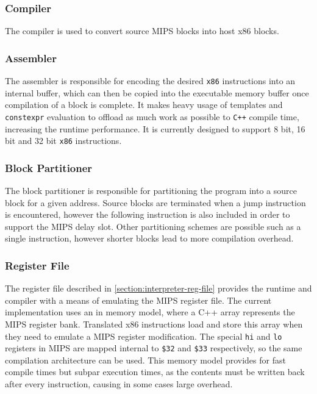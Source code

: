 \subsubsection{Compiler}

The compiler is used to convert source MIPS blocks into host x86 blocks.

\subsubsection{Assembler}

The assembler is responsible for encoding the desired \texttt{x86} instructions into an internal buffer, which can then be copied into the executable memory buffer once compilation of a block is complete. It makes heavy usage of templates and \texttt{constexpr} evaluation to offload as much work as possible to \texttt{C++} compile time, increasing the runtime performance. It is currently designed to support 8 bit, 16 bit and 32 bit \texttt{x86} instructions.

\subsubsection{Block Partitioner}

The block partitioner is responsible for partitioning the program into a source block for a given address. Source blocks are terminated when a jump instruction is encountered, however the following instruction is also included in order to support the MIPS delay slot. Other partitioning schemes are possible such as a single instruction, however shorter blocks lead to more compilation overhead.

\subsubsection{Register File}

The register file described in \autoref{section:interpreter-reg-file} provides the runtime and compiler with a means of emulating the MIPS register file. The current implementation uses an in memory model, where a C++ array represents the MIPS register bank. Translated x86 instructions load and store this array when they need to emulate a MIPS register modification. The special \texttt{hi} and \texttt{lo} registers in MIPS are mapped internal to \texttt{\$32} and \texttt{\$33} respectively, so the same compilation architecture can be used. This memory model provides for fast compile times but subpar execution times, as the contents must be written back after every instruction, causing in some cases large overhead.

